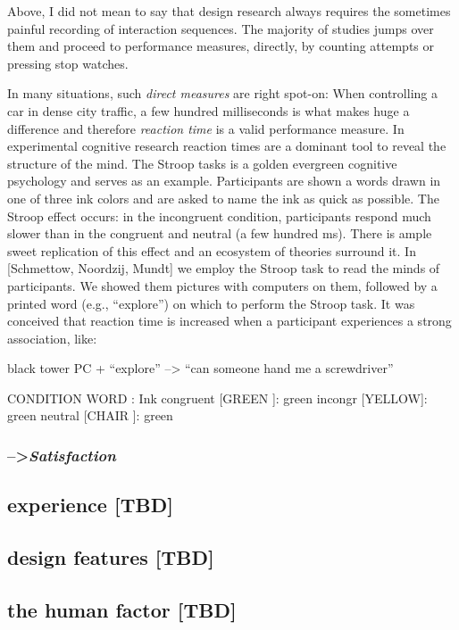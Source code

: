\documentclass[]{svmono}
\theoremstyle{definition}
\theoremstyle{definition}
\theoremstyle{definition}
\theoremstyle{remark}
\begin{document}
Above, I did not mean to say that design research always requires the
sometimes painful recording of interaction sequences. The majority of
studies jumps over them and proceed to performance measures, directly,
by counting attempts or pressing stop watches.

In many situations, such \emph{direct measures} are right spot-on: When
controlling a car in dense city traffic, a few hundred milliseconds is
what makes huge a difference and therefore \emph{reaction time} is a
valid performance measure. In experimental cognitive research reaction
times are a dominant tool to reveal the structure of the mind. The
Stroop tasks is a golden evergreen cognitive psychology and serves as an
example. Participants are shown a words drawn in one of three ink colors
and are asked to name the ink as quick as possible. The Stroop effect
occurs: in the incongruent condition, participants respond much slower
than in the congruent and neutral (a few hundred ms). There is ample
sweet replication of this effect and an ecosystem of theories surround
it. In {[}Schmettow, Noordzij, Mundt{]} we employ the Stroop task to
read the minds of participants. We showed them pictures with computers
on them, followed by a printed word (e.g., ``explore'') on which to
perform the Stroop task. It was conceived that reaction time is
increased when a participant experiences a strong association, like:

black tower PC + ``explore'' --\textgreater{} ``can someone hand me a
screwdriver''

CONDITION WORD : Ink congruent {[}GREEN {]}: green incongr {[}YELLOW{]}:
green neutral {[}CHAIR {]}: green

\subsubsection{\texorpdfstring{--\textgreater{}\emph{Satisfaction}}{--\textgreater{}Satisfaction}}\label{satisfaction}

\subsection{experience {[}TBD{]}}\label{experience-tbd}

\subsection{design features {[}TBD{]}}\label{design-features-tbd}

\subsection{the human factor {[}TBD{]}}\label{the-human-factor-tbd}
\end{document}
